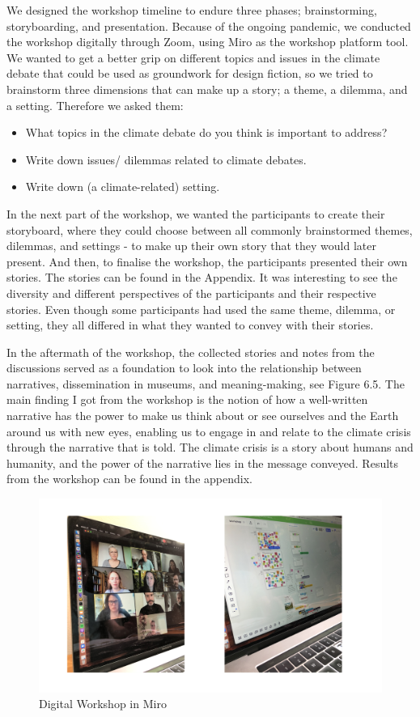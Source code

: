 We designed the workshop timeline to endure three phases; brainstorming, storyboarding, and presentation. Because of the ongoing pandemic, we conducted the workshop digitally through Zoom, using Miro as the workshop platform tool. We wanted to get a better grip on different topics and issues in the climate debate that could be used as groundwork for design fiction, so we tried to brainstorm three dimensions that can make up a story; a theme, a dilemma, and a setting. Therefore we asked them:

\begin{itemize}
    \item What topics in the climate debate do you think is important to address?
    \item Write down issues/ dilemmas related to climate debates.
    \item Write down (a climate-related) setting.
\end{itemize}

In the next part of the workshop, we wanted the participants to create their storyboard, where they could choose between all commonly brainstormed themes, dilemmas, and settings - to make up their own story that they would later present. And then, to finalise the workshop, the participants presented their own stories. The stories can be found in the Appendix. It was interesting to see the diversity and different perspectives of the participants and their respective stories. Even though some participants had used the same theme, dilemma, or setting, they all differed in what they wanted to convey with their stories. 

In the aftermath of the workshop, the collected stories and notes from the discussions served as a foundation to look into the relationship between narratives, dissemination in museums, and meaning-making, see Figure 6.5. The main finding I got from the workshop is the notion of how a well-written narrative has the power to make us think about or see ourselves and the Earth around us with new eyes, enabling us to engage in and relate to the climate crisis through the narrative that is told. The climate crisis is a story about humans and humanity, and the power of the narrative lies in the message conveyed. Results from the workshop can be found in the appendix.

\begin{figure}[H]
\includegraphics[width=13cm]{pictures/process/narrative_workshop.png}
\caption{Digital Workshop in Miro}
\centering 
\end{figure}


